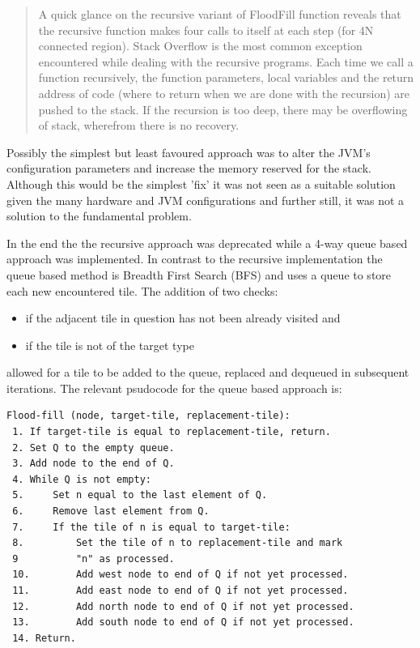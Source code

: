  \begin{quotation}
A quick glance on the recursive variant of FloodFill function reveals that the recursive function makes four calls to itself at each step (for 4N connected region). Stack Overflow is the most common exception encountered while dealing with the recursive programs. Each time we call a function recursively, the function parameters, local variables and the return address of code (where to return when we are done with the recursion) are pushed to the stack. If the recursion is too deep, there may be overflowing of stack, wherefrom there is no recovery.
 \end{quotation}
 
Possibly the simplest but least favoured approach was to alter the JVM's configuration parameters and increase the memory reserved for the stack.  Although this would be the simplest 'fix' it was not seen as a suitable solution given the many hardware and JVM configurations and further still, it was not a solution to the fundamental problem.

In the end the the recursive approach was deprecated while a 4-way queue based approach was implemented.  In contrast to the recursive implementation the queue based method is Breadth First Search (BFS) and uses a queue to store each new encountered tile.  The addition of two checks:

\begin{itemize}
  \item if the adjacent tile in question has not been already visited and
  \item if the tile is not of the target type
\end{itemize}

allowed for a tile to be added to the queue, replaced and dequeued in subsequent iterations. The relevant psudocode for the queue based approach is:

\begin{minipage}{0.9\textwidth}
	\begin{lstlisting}[caption={4-way queue based flood fill}, label={lst:queueFloodFill}]
Flood-fill (node, target-tile, replacement-tile):
 1. If target-tile is equal to replacement-tile, return.
 2. Set Q to the empty queue.
 3. Add node to the end of Q.
 4. While Q is not empty: 
 5.     Set n equal to the last element of Q.
 6.     Remove last element from Q.
 7.     If the tile of n is equal to target-tile:
 8.         Set the tile of n to replacement-tile and mark 
 9			"n" as processed.
 10.        Add west node to end of Q if not yet processed.
 11.        Add east node to end of Q if not yet processed.
 12.        Add north node to end of Q if not yet processed.
 13.        Add south node to end of Q if not yet processed.
 14. Return.
	\end{lstlisting}
\end{minipage}

